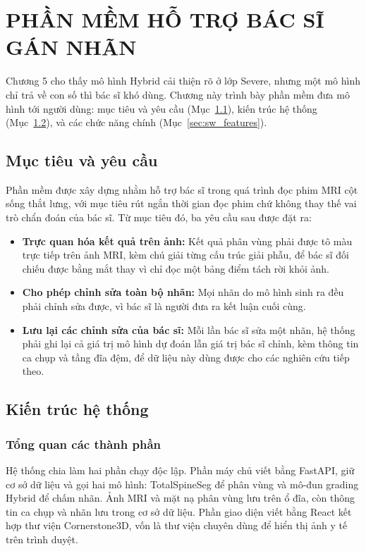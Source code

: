 \chapter{PHẦN MỀM HỖ TRỢ BÁC SĨ GÁN NHÃN}
\label{chap:software}

Chương 5 cho thấy mô hình Hybrid cải thiện rõ ở lớp Severe, nhưng một mô hình chỉ trả về con số thì bác sĩ khó dùng. Chương này trình bày phần mềm đưa mô hình tới người dùng: mục tiêu và yêu cầu (Mục~\ref{sec:sw_requirements}), kiến trúc hệ thống (Mục~\ref{sec:sw_architecture}), và các chức năng chính (Mục~\ref{sec:sw_features}).

\section{Mục tiêu và yêu cầu}
\label{sec:sw_requirements}

Phần mềm được xây dựng nhằm hỗ trợ bác sĩ trong quá trình đọc phim MRI cột sống thắt lưng, với mục tiêu rút ngắn thời gian đọc phim chứ không thay thế vai trò chẩn đoán của bác sĩ. Từ mục tiêu đó, ba yêu cầu sau được đặt ra:

\begin{itemize}
    \item \textbf{Trực quan hóa kết quả trên ảnh:} Kết quả phân vùng phải được tô màu trực tiếp trên ảnh MRI, kèm chú giải từng cấu trúc giải phẫu, để bác sĩ đối chiếu được bằng mắt thay vì chỉ đọc một bảng điểm tách rời khỏi ảnh.
    \item \textbf{Cho phép chỉnh sửa toàn bộ nhãn:} Mọi nhãn do mô hình sinh ra đều phải chỉnh sửa được, vì bác sĩ là người đưa ra kết luận cuối cùng.
    \item \textbf{Lưu lại các chỉnh sửa của bác sĩ:} Mỗi lần bác sĩ sửa một nhãn, hệ thống phải ghi lại cả giá trị mô hình dự đoán lẫn giá trị bác sĩ chỉnh, kèm thông tin ca chụp và tầng đĩa đệm, để dữ liệu này dùng được cho các nghiên cứu tiếp theo.
\end{itemize}

\section{Kiến trúc hệ thống}
\label{sec:sw_architecture}

\subsection{Tổng quan các thành phần}

Hệ thống chia làm hai phần chạy độc lập. Phần máy chủ viết bằng FastAPI, giữ cơ sở dữ liệu và gọi hai mô hình: TotalSpineSeg để phân vùng và mô-đun grading Hybrid để chấm nhãn. Ảnh MRI và mặt nạ phân vùng lưu trên ổ đĩa, còn thông tin ca chụp và nhãn lưu trong cơ sở dữ liệu. Phần giao diện viết bằng React kết hợp thư viện Cornerstone3D, vốn là thư viện chuyên dùng để hiển thị ảnh y tế trên trình duyệt.

